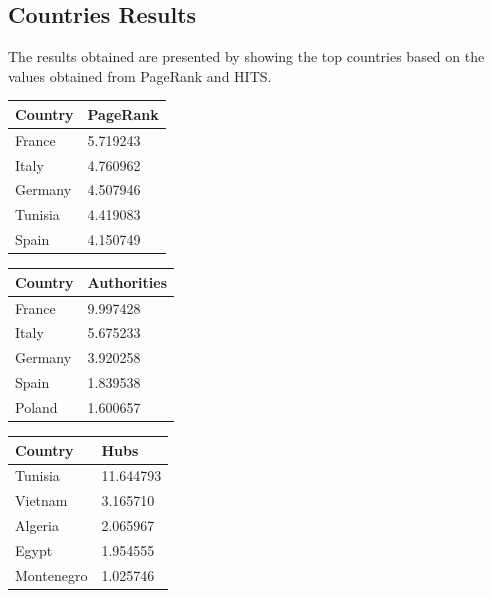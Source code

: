     \subsection*{Countries Results}
    The results obtained are presented by showing the top countries based on the values obtained from PageRank and HITS.
    \begin{table}[hbtp]
        \parbox{.25\linewidth}{
        \centering
        \begin{tabular}{l l}
            \hline
            \textbf{Country} & \textbf{PageRank} \\ \hline
            France & 5.719243 \\
            Italy & 4.760962 \\
            Germany & 4.507946 \\
            Tunisia & 4.419083 \\
            Spain & 4.150749 \\\hline
          \end{tabular}
          \label{tab:table-label}
        }
        \hfill
        \parbox{.25\linewidth}{
        \centering
        \begin{tabular}{l l}
            \hline
            \textbf{Country} & \textbf{Authorities} \\ \hline
            France & 9.997428 \\
            Italy & 5.675233 \\
            Germany & 3.920258 \\
            Spain & 1.839538 \\
            Poland & 1.600657 \\ \hline
          \end{tabular}
          \label{tab:table-label}
        }
        \hfill
        \parbox{.25\linewidth}{
        \centering
        \begin{tabular}{l l}
            \hline
            \textbf{Country} & \textbf{Hubs} \\ \hline
            Tunisia & 11.644793 \\
            Vietnam & 3.165710 \\
            Algeria & 2.065967 \\
            Egypt & 1.954555 \\
            Montenegro & 1.025746 \\ \hline
          \end{tabular}
          \label{tab:table-label}
        }
        \end{table}
    
